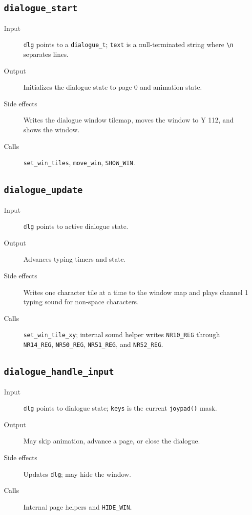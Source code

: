\subsection*{\texttt{dialogue\_start}}
\begin{description}
  \item[Input] \texttt{dlg} points to a \texttt{dialogue\_t}; \texttt{text} is a null-terminated string where \texttt{\textbackslash n} separates lines.
  \item[Output] Initializes the dialogue state to page 0 and animation state.
  \item[Side effects] Writes the dialogue window tilemap, moves the window to Y 112, and shows the window.
  \item[Calls] \texttt{set\_win\_tiles}, \texttt{move\_win}, \texttt{SHOW\_WIN}.
\end{description}

\subsection*{\texttt{dialogue\_update}}
\begin{description}
  \item[Input] \texttt{dlg} points to active dialogue state.
  \item[Output] Advances typing timers and state.
  \item[Side effects] Writes one character tile at a time to the window map and plays channel 1 typing sound for non-space characters.
  \item[Calls] \texttt{set\_win\_tile\_xy}; internal sound helper writes \texttt{NR10\_REG} through \texttt{NR14\_REG}, \texttt{NR50\_REG}, \texttt{NR51\_REG}, and \texttt{NR52\_REG}.
\end{description}

\subsection*{\texttt{dialogue\_handle\_input}}
\begin{description}
  \item[Input] \texttt{dlg} points to dialogue state; \texttt{keys} is the current \texttt{joypad()} mask.
  \item[Output] May skip animation, advance a page, or close the dialogue.
  \item[Side effects] Updates \texttt{dlg}; may hide the window.
  \item[Calls] Internal page helpers and \texttt{HIDE\_WIN}.
\end{description}

